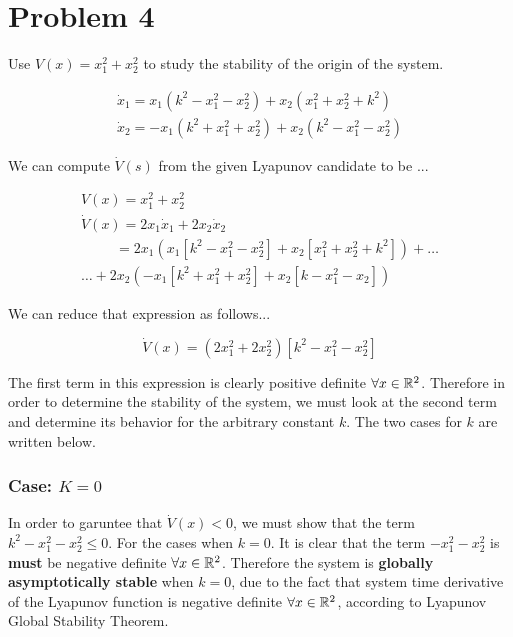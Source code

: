 \section*{Problem 4}

Use $V(x) = x_1^2 + x_2^2$ to study the stability of the origin of the system.

$$
\begin{array}{l}
\dot{x}_{1}=x_{1}\left(k^{2}-x_{1}^{2}-x_{2}^{2}\right)+x_{2}\left(x_{1}^{2}+x_{2}^{2}+k^{2}\right) \\
\dot{x}_{2}=-x_{1}\left(k^{2}+x_{1}^{2}+x_{2}^{2}\right)+x_{2}\left(k^{2}-x_{1}^{2}-x_{2}^{2}\right)
\end{array}
$$

\noindent We can compute $\dot{V}(s)$ from the given Lyapunov candidate to be ...

\begin{equation}
\begin{array}{l}
V(x)=x_{1}^{2}+x_{2}^{2} \\
\dot{V}(x)=2 x_{1} \dot{x}_{1}+2 x_{2} \dot{x}_{2} \\
\quad \quad \: \:= 2 x_{1}\left(x_{1}\left[k^{2}-x_{1}^{2}-x_{2}^{2}\right]+x_{2}\left[x_{1}^{2}+x_{2}^{2}+k^{2}\right]\right)+\ldots \\
\ldots+2 x_{2}\left(-x_{1}\left[k^{2}+x_{1}^{2}+x_{2}^{2}\right]+x_{2}\left[k-x_{1}^{2}-x_{2}\right]\right)
\end{array}
\end{equation}

\noindent We can reduce that expression as follows...

$$
\dot{V}(x) = \left( 2x_1^2 + 2x_2^2 \right) \left[ k^2 - x_1^2 -x_2^2 \right]
$$

\noindent The first term in this expression is clearly positive definite $\forall x\in \mathbb{R}^2$. Therefore in order to determine the stability of the system, we must look at the second term and determine its behavior for the arbitrary constant $k$. The two cases for $k$ are written below.

\subsubsection*{Case: $K = 0$}

In order to garuntee that $\dot{V}(x) < 0 $, we must show that the term $k^2 - x_1^2 -x_2^2 \leq 0 $. For the cases when $k = 0$. It is clear that the term $-x_1^2 - x_2^2$ is \textbf{must} be negative definite $\forall x \in \mathbb{R}^2$. Therefore the system is \textbf{globally asymptotically stable} when $k = 0$, due to the fact that system time derivative of the Lyapunov function is negative definite $\forall x \in \mathbb{R}^2$, according to Lyapunov Global Stability Theorem.


